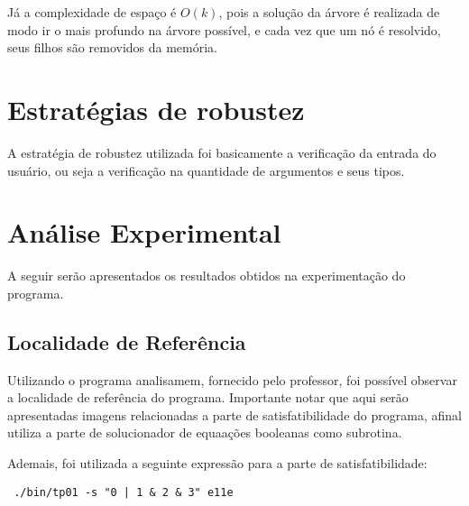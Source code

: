 \documentclass{article}
\begin{document}
Já a complexidade de espaço é $O(k)$, pois a solução da árvore é realizada de modo ir o mais profundo na árvore possível, e cada vez que um nó é resolvido, seus filhos são removidos da memória.
\section{Estratégias de robustez}

A estratégia de robustez utilizada foi basicamente a verificação da entrada do usuário, ou seja a verificação na quantidade de argumentos e seus tipos.

\section{Análise Experimental}

A seguir serão apresentados os resultados obtidos na experimentação do programa.

\subsection{Localidade de Referência}

Utilizando o programa analisamem, fornecido pelo professor, foi possível observar a localidade de referência do programa. Importante notar que aqui serão apresentadas imagens relacionadas a parte de satisfatibilidade do programa, afinal utiliza a parte de solucionador de equaações booleanas como subrotina.


Ademais, foi utilizada a seguinte expressão para a parte de satisfatibilidade:

\verb# ./bin/tp01 -s "0 | 1 & 2 & 3" e11e#

        
\end{document}
